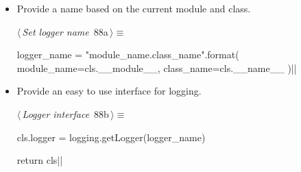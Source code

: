 \documentclass[%
    a4paper,    %
    justified,  %
    nobib,      %
    openany     %
]{tufte-book}
\begin{document}
\begin{itemize}
  \item Provide a name based on the current module and class.
    \begin{flushleft} \small
\begin{minipage}{\linewidth}\label{scrap57}\raggedright\small
{} $\langle\,${\itshape Set logger name}\nobreak\ {\footnotesize {88a}}$\,\rangle\equiv$
\vspace{-1ex}
\begin{pythoncode}
logger_name = "{module_name}.{class_name}".format(
    module_name=cls.__module__,
    class_name=cls.__name__
)|\NWsep|
\end{pythoncode}
\vspace{1.5ex}
\footnotesize
{}
\end{minipage}\vspace{4ex}
\end{flushleft}
\item Provide an easy to use interface for logging.
    \begin{flushleft} \small
\begin{minipage}{\linewidth}\label{scrap58}\raggedright\small
{} $\langle\,${\itshape Logger interface}\nobreak\ {\footnotesize {88b}}$\,\rangle\equiv$
\vspace{-1ex}
\begin{pythoncode}
cls.logger = logging.getLogger(logger_name)

return cls|\NWsep|
\end{pythoncode}
\vspace{1.5ex}
\footnotesize
{}
\end{minipage}\vspace{4ex}
\end{flushleft}
\end{itemize}
\end{document}
